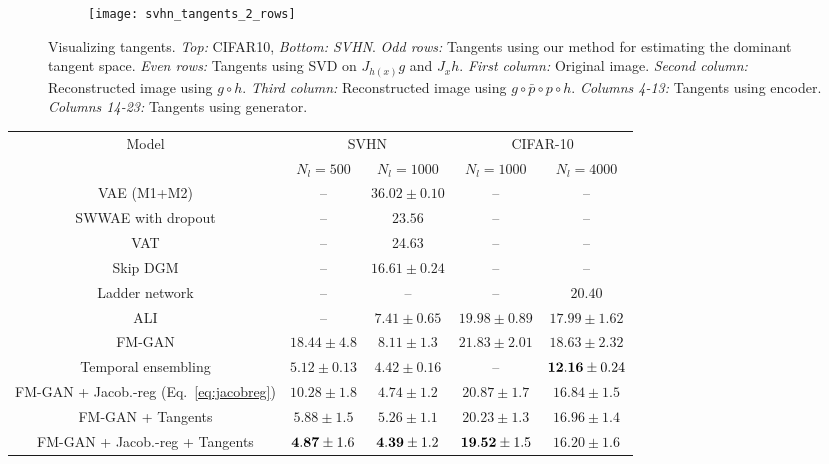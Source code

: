 \documentclass{article}
\begin{document}
\begin{figure}[t]
    \begin{subfigure}[t]{\textwidth}
        \centering
        \texttt{[image: svhn\_tangents\_2\_rows]}
    \end{subfigure}
    \caption{Visualizing tangents. \emph{Top:} CIFAR10, \emph{Bottom: SVHN}. \emph{Odd rows:} Tangents using our method for estimating the dominant tangent space. \emph{Even rows:} Tangents using SVD on $J_{h(x)} g$ and $J_x h$. \emph{First column:} Original image. \emph{Second column:} Reconstructed image using $g \circ h$. \emph{Third column:} Reconstructed image using $g\circ \bar{p} \circ p \circ h$. \emph{Columns 4-13:} Tangents using encoder. \emph{Columns 14-23:} Tangents using generator.}
    \label{tans}
    \vspace{-4mm}
\end{figure}\begin{table}[t]
\centering
\begin{tabular}{c c c c  c  }
\toprule
\multirow{ 2}{*}{Model} & \multicolumn{2}{c}{~~~SVHN~~~}  & \multicolumn{2}{c}{CIFAR-10} \\
& {$N_l = 500$} & {$N_l=1000$} & {$N_l=1000$} & {$N_l=4000$} \\
\midrule
VAE (M1+M2) \cite{kingma2014semi} & --  & $36.02\pm 0.10$ & -- & --  \\
SWWAE with dropout \cite{zhao2015stacked} & --  & $23.56$ & -- & --  \\
VAT \cite{miyato2015distributional} & --  & 24.63 & -- & --  \\
Skip DGM \cite{maaloe2016auxiliary} & --  & $16.61\pm 0.24$ & -- & --  \\
Ladder network \cite{rasmus2015semi} & -- & -- & -- & $20.40$ \\
ALI \cite{dumoulin2016adversarially} &  -- & $7.41 \pm 0.65$ & $19.98\pm 0.89$ & $17.99\pm 1.62$  \\
FM-GAN \cite{salimans2016improved} & $18.44\pm 4.8$  & $8.11\pm 1.3$ & $21.83\pm 2.01$ & $18.63 \pm 2.32$  \\
Temporal ensembling \cite{laine2016temporal} & $5.12\pm 0.13$ & $4.42\pm 0.16$ & -- & ${\bf 12.16}\pm 0.24$ \\
FM-GAN + Jacob.-reg (Eq.~\eqref{eq:jacobreg}) & $10.28\pm 1.8$  & $4.74\pm 1.2$ & $20.87\pm 1.7$ &  $16.84\pm 1.5$ \\
FM-GAN + Tangents  & $5.88\pm 1.5$  & $5.26\pm 1.1$  & $20.23\pm 1.3$ & $16.96 \pm 1.4$  \\
FM-GAN + Jacob.-reg + Tangents  & ${\bf 4.87} \pm 1.6$   & ${\bf 4.39} \pm 1.2$ & ${\bf 19.52}\pm 1.5$ & ${16.20}\pm 1.6$  \\


\end{tabular}
\end{table}
\end{document}

